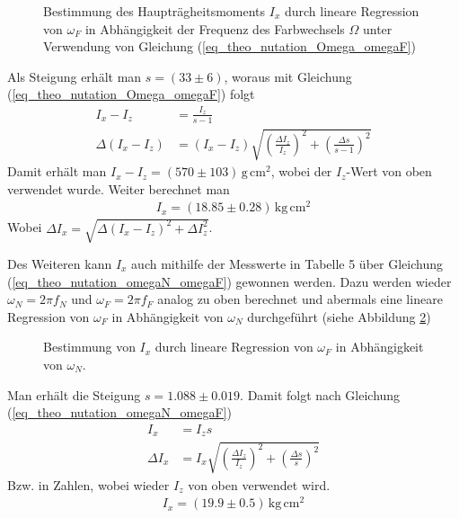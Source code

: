 \documentclass[12pt,a4paper,german]{scrartcl}
\numberwithin{equation}{section}
\begin{document}
  \begin{figure}[H]
    \centering
    
    \caption{Bestimmung des Haupträgheitsmoments $I_x$ durch lineare Regression von $\omega_F$ in Abhängigkeit der Frequenz des Farbwechsels $\Omega$ unter Verwendung von Gleichung (\ref{eq_theo_nutation_Omega_omegaF})}
    \label{fig_I_x_1}
  \end{figure}

  Als Steigung erhält man $s = (33 \pm 6)$, woraus mit Gleichung (\ref{eq_theo_nutation_Omega_omegaF}) folgt
  \begin{align}
    I_x - I_z &= \frac{I_z}{s - 1} \nonumber \\
    \Delta(I_x - I_z) &= (I_x - I_z) \sqrt{\left(\frac{\Delta I_z}{I_z}\right)^2 + \left(\frac{\Delta s}{s - 1}\right)^2}
  \end{align}
  Damit erhält man $I_x - I_z = (570 \pm 103) \, \text{g} \, \text{cm}^2$, wobei der $I_z$-Wert von oben verwendet wurde. Weiter berechnet man
  \begin{align}
    I_x = (18.85 \pm 0.28) \, \text{kg} \, \text{cm}^2
  \end{align}
  Wobei $\Delta I_x = \sqrt{\Delta(I_x - I_z)^2 + \Delta I_z^2}$.

  Des Weiteren kann $I_x$ auch mithilfe der Messwerte in Tabelle 5 über Gleichung (\ref{eq_theo_nutation_omegaN_omegaF}) gewonnen werden.
  Dazu werden wieder $\omega_N = 2 \pi f_N$ und $\omega_F = 2 \pi f_F$ analog zu oben berechnet und abermals eine lineare Regression von $\omega_F$ in Abhängigkeit von $\omega_N$ durchgeführt (siehe Abbildung \ref{fig_I_x_2})

  \begin{figure}[H]
    \centering
    
    \caption{Bestimmung von $I_x$ durch lineare Regression von $\omega_F$ in Abhängigkeit von $\omega_N$.}
    \label{fig_I_x_2}
  \end{figure}

  Man erhält die Steigung $s = 1.088 \pm 0.019$. Damit folgt nach Gleichung (\ref{eq_theo_nutation_omegaN_omegaF})
  \begin{align}
    I_x &= I_z s \nonumber \\
    \Delta I_x &= I_x \sqrt{\left(\frac{\Delta I_z}{I_z}\right)^2 + \left(\frac{\Delta s}{s}\right)^2}
  \end{align}
  Bzw. in Zahlen, wobei wieder $I_z$ von oben verwendet wird.
  \begin{align}
    I_x = (19.9 \pm 0.5) \, \text{kg} \, \text{cm}^2
  \end{align}
\end{document}
